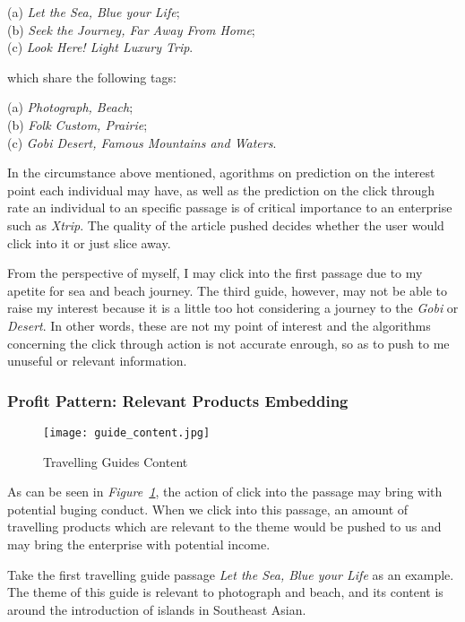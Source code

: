 \documentclass{article}
\begin{document}
	(a)\emph{ Let the Sea, Blue your Life};\\
	(b)\emph{ Seek the Journey, Far Away From Home};\\
	(c)\emph{ Look Here! Light Luxury Trip}.

	which share the following tags:

	(a)\emph{ Photograph, Beach};\\
	(b)\emph{ Folk Custom, Prairie};\\
	(c)\emph{ Gobi Desert, Famous Mountains and Waters}.

    In the circumstance above mentioned, agorithms on prediction on the interest point each individual may have, as well as the prediction on the click through rate an individual to an specific passage is of critical importance to an enterprise such as \emph{Xtrip}. The quality of the article pushed decides whether the user would click into it or just slice away. 

    From the perspective of myself, I may click into the first passage due to my apetite for sea and beach journey. The third guide, however, may not be able to raise my interest because it is a little too hot considering a journey to the \emph{Gobi} or \emph{Desert}. In other words, these are not my point of interest and the algorithms concerning the click through action is not accurate enrough, so as to push to me unuseful or relevant information.

    \subsubsection{Profit Pattern: Relevant Products Embedding}
    \label{sec:pprp}
    
    \begin{figure}[!h]
		\centering
		\texttt{[image: guide\_content.jpg]}
		\caption{\small{Travelling Guides Content}}
		\label{fig:gc}
	\end{figure}

	As can be seen in \emph{Figure~\ref{fig:gc}}, the action of click into the passage may bring with potential buging conduct. When we click into this passage, an amount of travelling products which are relevant to the theme would be pushed to us and may bring the enterprise with potential income. 

	Take the first travelling guide passage \emph{Let the Sea, Blue your Life} as an example. The theme of this guide is relevant to photograph and beach, and its content is around the introduction of islands in Southeast Asian. 
\end{document}
